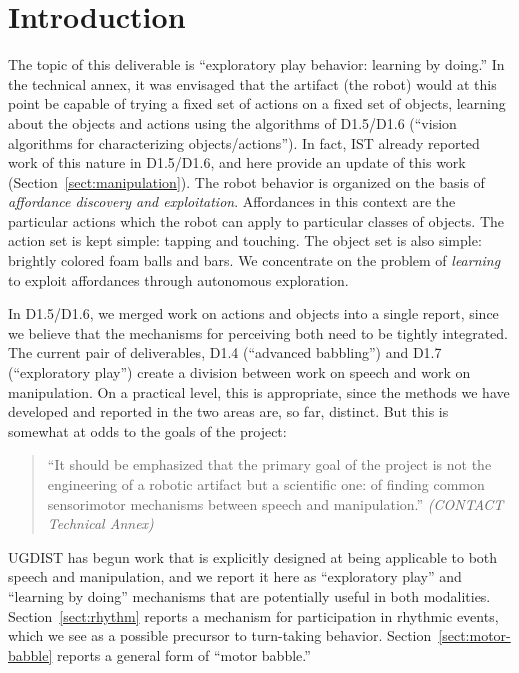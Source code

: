 
\section{Introduction}

The topic of this deliverable is ``exploratory play behavior: learning
by doing.''  In the technical annex, it was envisaged that
the artifact (the robot) would at this point be capable of trying a fixed
set of actions on a fixed set of objects, learning about the objects
and actions using the algorithms of D1.5/D1.6 (``vision algorithms for characterizing objects/actions'').
%
In fact, IST already reported work of this nature in D1.5/D1.6, 
and here provide an update of this work (Section~\ref{sect:manipulation}).
%
The robot behavior is organized on the basis of {\em affordance
discovery and exploitation}.  Affordances in this context are the
particular actions which the robot can apply to particular classes
of objects.  The action set is kept simple: tapping and touching.
The object set is also simple: brightly colored foam balls and
bars.  We concentrate on the problem of {\em learning} to exploit 
affordances through autonomous exploration.

In D1.5/D1.6, we merged work on actions and objects into a single
report, since we believe that the mechanisms for perceiving both
need to be tightly integrated.  The current pair of deliverables,
D1.4 (``advanced babbling'') and D1.7 (``exploratory play'')
create a division between work on speech and work on manipulation.
On a practical level, this is appropriate, since the methods we have
developed and reported in the two areas are, so far, distinct.
But this is somewhat at odds to the goals of the project:

\begin{quote}

``It should be emphasized that the primary goal of the project is not
the engineering of a robotic artifact but a scientific one: of finding
common sensorimotor mechanisms between speech and manipulation.''
{\it (CONTACT Technical Annex)}

\end{quote}

UGDIST has begun work that is explicitly designed at being applicable
to both speech and manipulation, and we report it here as
``exploratory play'' and ``learning by doing'' mechanisms that
are potentially useful in both modalities.  Section~\ref{sect:rhythm} reports
a mechanism for participation in rhythmic events, which we see
as a possible precursor to turn-taking behavior.  
Section~\ref{sect:motor-babble}
reports a general form of ``motor babble.''



